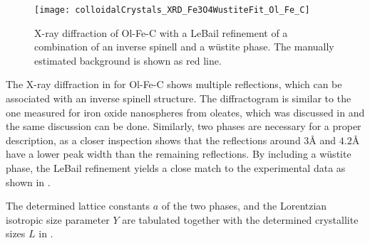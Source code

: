 \documentclass[\main/dresen_thesis.tex]{subfiles}
\begin{document}
  \label{sec:colloidalCrystals:nanoparticle:xrd}
  \begin{figure}[tb]
    \centering
    \texttt{[image: colloidalCrystals\_XRD\_Fe3O4WustiteFit\_Ol\_Fe\_C]}
    \caption{\label{fig:colloidalCrystals:nanoparticle:xrd}X-ray diffraction of Ol-Fe-C with a LeBail refinement of a combination of an inverse spinell and a w\"ustite phase. The manually estimated background is shown as red line.}
  \end{figure}

  The X-ray diffraction in  for Ol-Fe-C shows multiple reflections, which can be associated with an inverse spinell structure.
  The diffractogram is similar to the one measured for iron oxide nanospheres from oleates, which was discussed in  and the same discussion can be done.
  Similarly, two phases are necessary for a proper description, as a closer inspection shows that the reflections around $3 \unit{\angstrom}$ and $4.2 \unit{\angstrom}$ have a lower peak width than the remaining reflections.
  By including a w\"ustite phase, the LeBail refinement yields a close match to the experimental data as shown in .

  The determined lattice constants $a$ of the two phases, and the Lorentzian isotropic size parameter $Y$ are tabulated together with the determined crystallite sizes $L$ in .
\end{document}

